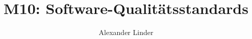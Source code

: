 \documentclass{beamer}
\title{M10: Software-Qualitätsstandards}
\author{Alexander Linder}
\date{} %
\begin{document}
    \begin{frame}
        \maketitle
    \end{frame}
\end{document}
